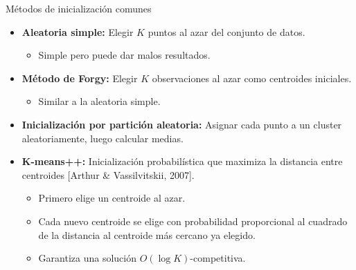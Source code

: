 \documentclass[aspectratio=169]{beamer}
\begin{document}
\begin{frame}{Métodos de inicialización comunes}
    \begin{itemize}
        \item \textbf{Aleatoria simple:} Elegir \(K\) puntos al azar del conjunto de datos.
        \begin{itemize}
            \item Simple pero puede dar malos resultados.
        \end{itemize}
        
        \item \textbf{Método de Forgy:} Elegir \(K\) observaciones al azar como centroides iniciales.
        \begin{itemize}
            \item Similar a la aleatoria simple.
        \end{itemize}
        
        \item \textbf{Inicialización por partición aleatoria:} Asignar cada punto a un cluster aleatoriamente, luego calcular medias.
        
        \item \textbf{K-means++:} Inicialización probabilística que maximiza la distancia entre centroides [Arthur \& Vassilvitskii, 2007].
        \begin{itemize}
            \item Primero elige un centroide al azar.
            \item Cada nuevo centroide se elige con probabilidad proporcional al cuadrado de la distancia al centroide más cercano ya elegido.
            \item Garantiza una solución \(O(\log K)\)-competitiva.
        \end{itemize}
    \end{itemize}
\end{frame}
\end{document}
